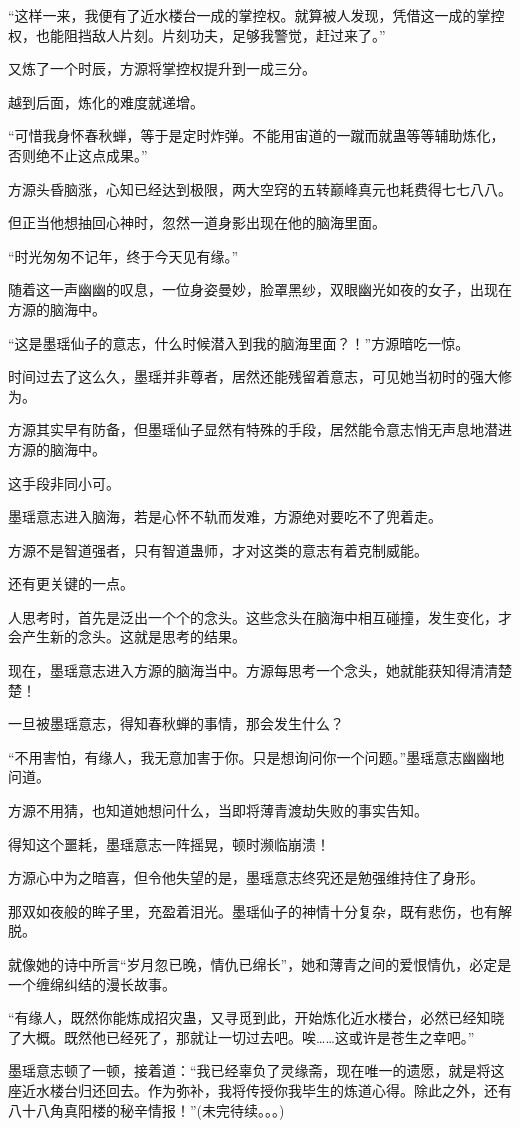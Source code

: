 \begin{this_body}
“这样一来，我便有了近水楼台一成的掌控权。就算被人发现，凭借这一成的掌控权，也能阻挡敌人片刻。片刻功夫，足够我警觉，赶过来了。”

又炼了一个时辰，方源将掌控权提升到一成三分。

越到后面，炼化的难度就递增。

“可惜我身怀春秋蝉，等于是定时炸弹。不能用宙道的一蹴而就蛊等等辅助炼化，否则绝不止这点成果。”

方源头昏脑涨，心知已经达到极限，两大空窍的五转巅峰真元也耗费得七七八八。

但正当他想抽回心神时，忽然一道身影出现在他的脑海里面。

“时光匆匆不记年，终于今天见有缘。”

随着这一声幽幽的叹息，一位身姿曼妙，脸罩黑纱，双眼幽光如夜的女子，出现在方源的脑海中。

“这是墨瑶仙子的意志，什么时候潜入到我的脑海里面？！”方源暗吃一惊。

时间过去了这么久，墨瑶并非尊者，居然还能残留着意志，可见她当初时的强大修为。

方源其实早有防备，但墨瑶仙子显然有特殊的手段，居然能令意志悄无声息地潜进方源的脑海中。

这手段非同小可。

墨瑶意志进入脑海，若是心怀不轨而发难，方源绝对要吃不了兜着走。

方源不是智道强者，只有智道蛊师，才对这类的意志有着克制威能。

还有更关键的一点。

人思考时，首先是泛出一个个的念头。这些念头在脑海中相互碰撞，发生变化，才会产生新的念头。这就是思考的结果。

现在，墨瑶意志进入方源的脑海当中。方源每思考一个念头，她就能获知得清清楚楚！

一旦被墨瑶意志，得知春秋蝉的事情，那会发生什么？

“不用害怕，有缘人，我无意加害于你。只是想询问你一个问题。”墨瑶意志幽幽地问道。

方源不用猜，也知道她想问什么，当即将薄青渡劫失败的事实告知。

得知这个噩耗，墨瑶意志一阵摇晃，顿时濒临崩溃！

方源心中为之暗喜，但令他失望的是，墨瑶意志终究还是勉强维持住了身形。

那双如夜般的眸子里，充盈着泪光。墨瑶仙子的神情十分复杂，既有悲伤，也有解脱。

就像她的诗中所言“岁月忽已晚，情仇已绵长”，她和薄青之间的爱恨情仇，必定是一个缠绵纠结的漫长故事。

“有缘人，既然你能炼成招灾蛊，又寻觅到此，开始炼化近水楼台，必然已经知晓了大概。既然他已经死了，那就让一切过去吧。唉……这或许是苍生之幸吧。”

墨瑶意志顿了一顿，接着道：“我已经辜负了灵缘斋，现在唯一的遗愿，就是将这座近水楼台归还回去。作为弥补，我将传授你我毕生的炼道心得。除此之外，还有八十八角真阳楼的秘辛情报！”(未完待续。。。)

\end{this_body}

